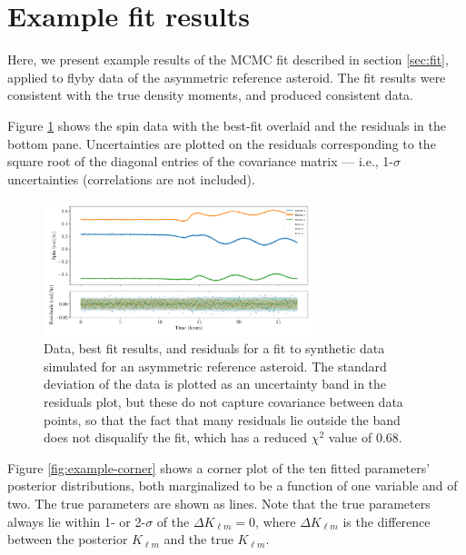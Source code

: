 \documentclass[fleqn,usenatbib]{mnras}
\begin{document}
\section{Example fit results}
\label{app:example}

Here, we present example results of the MCMC fit described in section \ref{sec:fit}, applied to flyby data of the asymmetric reference asteroid. The fit results were consistent with the true density moments, and produced consistent data.

Figure \ref{fig:example-residuals} shows the spin data with the best-fit overlaid and the residuals in the bottom pane. Uncertainties are plotted on the residuals corresponding to the square root of the diagonal entries of the covariance matrix --- i.e., 1-$\sigma$ uncertainties (correlations are not included).

\begin{figure}
  \centering
  \includegraphics[width=0.7\textwidth]{figs/example-residuals.pdf}
  \caption{Data, best fit results, and residuals for a fit to synthetic data simulated for an asymmetric reference asteroid. The standard deviation of the data is plotted as an uncertainty band in the residuals plot, but these do not capture covariance between data points, so that the fact that many residuals lie outside the band does not disqualify the fit, which has a reduced $\chi^2$ value of 0.68.}
  \label{fig:example-residuals}
\end{figure}

Figure \ref{fig:example-corner} shows a corner plot of the ten fitted parameters' posterior distributions, both marginalized to be a function of one variable and of two. The true parameters are shown as lines. Note that the true parameters always lie within 1- or 2-$\sigma$ of the $\Delta K_{\ell m} = 0$, where $\Delta K_{\ell m}$ is the difference between the posterior $K_{\ell m}$ and the true $K_{\ell m}$.
\end{document}
